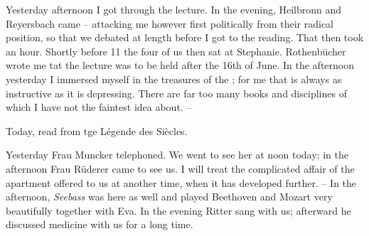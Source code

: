 
Yesterday afternoon I got through the lecture. In the evening, Heilbronn and Reyersbach came -- attacking me however first politically from their radical position, so that we debated at length before I got to the reading. That then took an hour. Shortly before 11 the four of us then sat at Stephanie. Rothenbücher wrote me tat the lecture was to be held after the 16th of June. In the afternoon yesterday I immersed myself in the treasures of the ; for me that is always as instructive as it is depressing. There are far too many books and disciplines of which I have not the faintest idea about. --

Today, read from tge Légende des Siècles.

Yesterday Frau Muncker telephoned. We went to see her at noon today; in the afternoon Frau Rüderer came to see us. I will treat the complicated affair of the apartment offered to us at another time, when it has developed further. -- In the afternoon, \textit{Seebass} was here as well and played Beethoven and Mozart very beautifully together with Eva. In the evening Ritter sang with us; afterward he discussed medicine with us for a long time.

